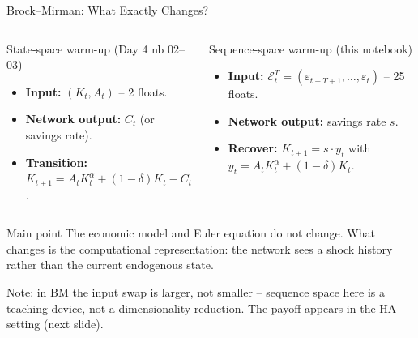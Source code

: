 \documentclass[aspectratio=169,11pt]{beamer}
\newcommand{\emphc}[1]{\textcolor{harvardcrimson}{#1}}
\newcommand{\E}{\mathcal{E}}
\begin{document}
\begin{frame}{Brock--Mirman: What Exactly Changes?}
\small
\begin{columns}[T]
\begin{block}{State-space warm-up (Day 4 nb 02--03)}
\begin{itemize}\itemsep3pt
    \item \textbf{Input:} $(K_t, A_t)$ -- 2 floats.
    \item \textbf{Network output:} $C_t$ (or savings rate).
    \item \textbf{Transition:} $K_{t+1} = A_t K_t^\alpha + (1-\delta) K_t - C_t$.
\end{itemize}
\end{block}

\begin{block}{Sequence-space warm-up (this notebook)}
\begin{itemize}\itemsep3pt
    \item \textbf{Input:} $\E_t^T = (\varepsilon_{t-T+1}, \ldots, \varepsilon_t)$ -- 25 floats.
    \item \textbf{Network output:} savings rate $s$.
    \item \textbf{Recover:} $K_{t+1} = s\cdot y_t$ with $y_t = A_t K_t^\alpha + (1-\delta) K_t$.
\end{itemize}
\end{block}
\end{columns}

\vspace{0.30em}
\begin{alertblock}{Main point}
The \emphc{economic model and Euler equation do not change}.  What changes is the \emphc{computational representation}: the network sees a shock history rather than the current endogenous state.
\end{alertblock}

\vspace{0.20em}
{\footnotesize Note: in BM the input swap is \emphc{larger}, not smaller -- sequence space here is a teaching device, not a dimensionality reduction.  The payoff appears in the HA setting (next slide).}
\end{frame}
\end{document}
